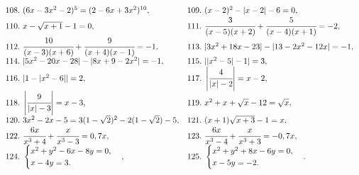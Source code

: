 \documentclass[12pt]{article}
\begin{document}
$\begin{array}{ll}
108.\ (6x-3x^2-2)^5=(2-6x+3x^2)^{10},&
109.\ (x-2)^2-|x-2|-6=0,\\
110.\ x-\sqrt{x+1}-1=0,&
111.\ \cfrac{3}{(x-5)(x+2)}+\cfrac{5}{(x-4)(x+1)}=-2,\\
112.\ \cfrac{10}{(x-3)(x+6)}+\cfrac{9}{(x+4)(x-1)}=-1,&
113.\ |3x^2+18x-23|-|13-2x^2-12x|=-1,\\
114.\ |5x^2-20x-28|-|8x+9-2x^2|=-1,&
115.\ ||x^2-5|-1|=3,\\
116.\ |1-|x^2-6||=2,&
117.\ \left|\cfrac{4}{|x|-2}\right|=x-2,\\
118.\ \left|\cfrac{9}{|x|-3}\right|=x-3,&
119.\ x^2+x+\sqrt{x}-12=\sqrt{x},\\
120.\ 3x^2-2x-5=3(1-\sqrt{2})^2-2(1-\sqrt{2})-5,&
121.\ (x+1)\sqrt{x+3}-1=x,\\
122.\ \cfrac{6x}{x^3+4}+\cfrac{x}{x^3-3}=0,7x,&
123.\ \cfrac{6x}{x^3-4}+\cfrac{x}{x^3+3}=-0,7x,\\
124.\ \begin{cases} x^2+y^2-6x-8y=0,\\ x-4y=3.\end{cases},&
125.\ \begin{cases} x^2+y^2+8x-6y=0,\\ x-5y=-2.\end{cases}.
\end{array}$
\newpage
\end{document}
